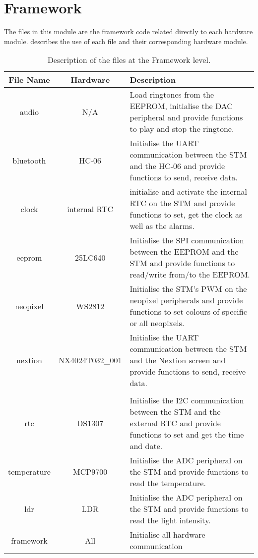 \section{Framework}
The files in this module are the framework code related directly to each hardware module.  describes the use of each file and their corresponding hardware module.
\begin{table}[h!]
\centering
\caption{Description of the files at the Framework level.}
\label{table:framework}
\begin{tabular}{ccp{20em}}
\hline
\hline
\toprule
\textbf{File Name} & \textbf{Hardware} & \textbf{Description} \\
\bottomrule    
\toprule
audio & N/A & Load ringtones from the EEPROM, initialise the DAC peripheral and provide functions to play and stop the ringtone.  \\
\midrule
bluetooth & HC-06 & Initialise the UART communication between the STM and the HC-06 and provide functions to send, receive data.\\
\midrule
clock & internal RTC & initialise and activate the internal RTC on the STM and provide functions to set, get the clock as well as the alarms.\\
\midrule
eeprom & 25LC640 & Initialise the SPI communication between the EEPROM and the STM and provide functions to read/write from/to the EEPROM.\\
\midrule
neopixel & WS2812 & Initialise the STM's PWM on the neopixel peripherals and provide functions to set colours of specific or all neopixels.\\
\midrule
nextion & NX4024T032\_001 & Initialise the UART communication between the STM and the Nextion screen and provide functions to send, receive data.\\\\
\midrule
rtc & DS1307 & Initialise the I2C communication between the STM and the external RTC and provide functions to set and get the time and date.\\
\midrule
temperature & MCP9700 & Initialise the ADC peripheral on the STM and provide functions to read the temperature.\\
\midrule
ldr & LDR & Initialise the ADC peripheral on the STM and provide functions to read the light intensity.\\
\midrule
framework & All & Initialise all hardware communication\\
\hline
\hline
\end{tabular}
\end{table}

